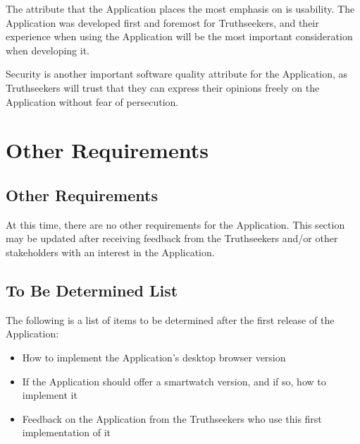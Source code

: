 The attribute that the Application places the most emphasis on is usability. The Application was developed first and foremost for Truthseekers, and their experience when using the Application will be the most important consideration when developing it. 

Security is another important software quality attribute for the Application, as Truthseekers will trust that they can express their opinions freely on the Application without fear of persecution. 

\newpage

\chapter{Other Requirements}
\label{OtherRequirements}

\section{Other Requirements}

At this time, there are no other requirements for the Application. This section may be updated after receiving feedback from the Truthseekers and/or other stakeholders with an interest in the Application.

\begin{appendices}
\chapter{To Be Determined List}
The following is a list of items to be determined after the first release of the Application:

\begin{itemize}
\item How to implement the Application’s desktop browser version
\item If the Application should offer a smartwatch version, and if so, how to implement it
\item Feedback on the Application from the Truthseekers who use this first implementation of it
\end{itemize}


\end{appendices}


